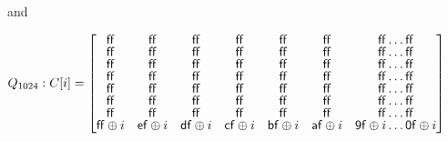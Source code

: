     and 

    $Q_{1024}: C[i] = \renewcommand\arraystretch{0.75}
    \begin{bmatrix}
      \mathsf{ff} & \mathsf{ff} & \mathsf{ff} & \mathsf{ff} & \mathsf{ff} & \mathsf{ff} & \mathsf{ff} \dots \mathsf{ff} \\
      \mathsf{ff} & \mathsf{ff} & \mathsf{ff} & \mathsf{ff} & \mathsf{ff} & \mathsf{ff} & \mathsf{ff} \dots \mathsf{ff} \\
      \mathsf{ff} & \mathsf{ff} & \mathsf{ff} & \mathsf{ff} & \mathsf{ff} & \mathsf{ff} & \mathsf{ff} \dots \mathsf{ff} \\
      \mathsf{ff} & \mathsf{ff} & \mathsf{ff} & \mathsf{ff} & \mathsf{ff} & \mathsf{ff} & \mathsf{ff} \dots \mathsf{ff} \\
      \mathsf{ff} & \mathsf{ff} & \mathsf{ff} & \mathsf{ff} & \mathsf{ff} & \mathsf{ff} & \mathsf{ff} \dots \mathsf{ff} \\
      \mathsf{ff} & \mathsf{ff} & \mathsf{ff} & \mathsf{ff} & \mathsf{ff} & \mathsf{ff} & \mathsf{ff} \dots \mathsf{ff} \\
      \mathsf{ff} & \mathsf{ff} & \mathsf{ff} & \mathsf{ff} & \mathsf{ff} & \mathsf{ff} & \mathsf{ff} \dots \mathsf{ff} \\
      \mathsf{ff} \oplus i & \mathsf{ef} \oplus i & \mathsf{df} \oplus i & \mathsf{cf} \oplus i & \mathsf{bf} \oplus i & \mathsf{af} \oplus i & \mathsf{9f} \oplus i \dots \mathsf{0f} \oplus i
    \end{bmatrix}$ \\
    
